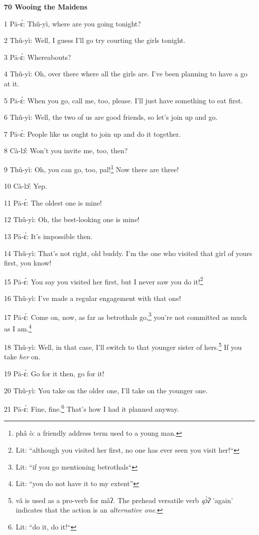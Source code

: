 
\textbf{70 Wooing the Maidens}

1 Pā-ɛ́: Thû-yì, where are you going tonight?

2 Thû-yì: Well, I guess I'll go try courting the girls tonight.

3 Pā-ɛ́: Whereabouts?

4 Thû-yì: Oh, over there where all the girls are. I've been planning to have
a go at it.

5 Pā-ɛ́: When you go, call me, too, please. I'll just have something to eat
first.

6 Thû-yì: Well, the two of us are good friends, so let's join up and go.

7 Pā-ɛ́: People like us ought to join up and do it together.

8 Cà-lɔ̂: Won't you invite me, too, then?

9 Thû-yì: Oh, you can go, too, pal!\footnote{phâ ò: a friendly address term used to a young man.} Now there are three!

10 Cà-lɔ̂: Yep.

11 Pā-ɛ́: The oldest one is mine!

12 Thû-yì: Oh, the best-looking one is mine!

13 Pā-ɛ́: It's impossible then.

14 Thû-yì: That's not right, old buddy. I'm the one who visited that girl of
yours first, you know!

15 Pā-ɛ́: You say you visited her first, but I never saw you do it!\footnote{Lit: ``although you visited her first, no one has ever seen you visit her!``}

16 Thû-yì: I've made a regular engagement with that one!

17 Pā-ɛ́: Come on, now, as far as betrothals go,\footnote{Lit: ``if you go mentioning betrothals``} you're not committed as
much as I am.\footnote{Lit: ``you do not have it to my extent''}

18 Thû-yì: Well, in that case, I'll switch to that younger sister of hers.\footnote{vâ is used as a pro-verb for mâʔ. The prehead versatile verb \textit{qɔ̀ʔ} 'again' indicates that the action is an \textit{alternative one}.}
If you take \textit{her} on.

19 Pā-ɛ́: Go for it then, go for it!

20 Thû-yì: You take on the older one, I'll take on the younger one.

21 Pā-ɛ́: Fine, fine.\footnote{Lit: ``do it, do it!``} That's how I had it planned anyway.

